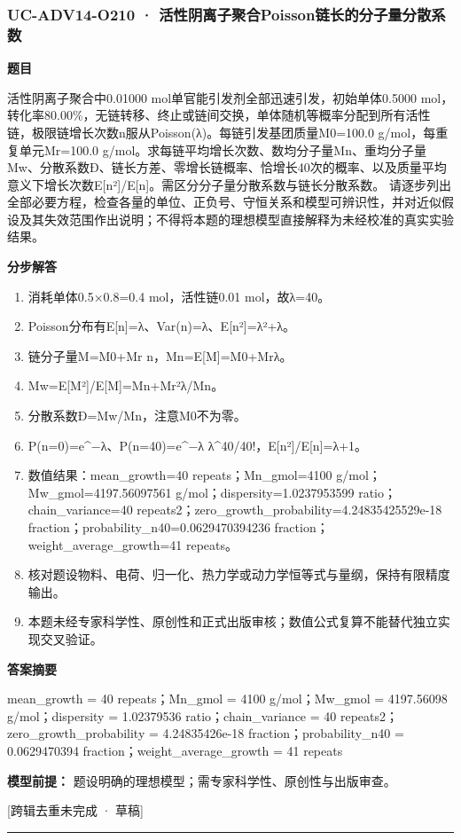 \documentclass[UTF8,11pt,a4paper]{ctexart}
\begin{document}
\subsubsection*{UC-ADV14-O210 · 活性阴离子聚合Poisson链长的分子量分散系数}
\noindent\textbf{题目}\par
活性阴离子聚合中0.01000 mol单官能引发剂全部迅速引发，初始单体0.5000 mol，转化率80.00\%，无链转移、终止或链间交换，单体随机等概率分配到所有活性链，极限链增长次数n服从Poisson(λ)。每链引发基团质量M0=100.0 g/mol，每重复单元Mr=100.0 g/mol。求每链平均增长次数、数均分子量Mn、重均分子量Mw、分散系数Đ、链长方差、零增长链概率、恰增长40次的概率、以及质量平均意义下增长次数E[n²]/E[n]。需区分分子量分散系数与链长分散系数。 请逐步列出全部必要方程，检查各量的单位、正负号、守恒关系和模型可辨识性，并对近似假设及其失效范围作出说明；不得将本题的理想模型直接解释为未经校准的真实实验结果。\par
\medskip\noindent\textbf{分步解答}
\begin{enumerate}
\item 消耗单体0.5×0.8=0.4 mol，活性链0.01 mol，故λ=40。
\item Poisson分布有E[n]=λ、Var(n)=λ、E[n²]=λ²+λ。
\item 链分子量M=M0+Mr n，Mn=E[M]=M0+Mrλ。
\item Mw=E[M²]/E[M]=Mn+Mr²λ/Mn。
\item 分散系数Đ=Mw/Mn，注意M0不为零。
\item P(n=0)=e\textasciicircum{}−λ、P(n=40)=e\textasciicircum{}−λ λ\textasciicircum{}40/40!，E[n²]/E[n]=λ+1。
\item 数值结果：mean\_growth=40 repeats；Mn\_gmol=4100 g/mol；Mw\_gmol=4197.56097561 g/mol；dispersity=1.0237953599 ratio；chain\_variance=40 repeats2；zero\_growth\_probability=4.24835425529e-18 fraction；probability\_n40=0.0629470394236 fraction；weight\_average\_growth=41 repeats。
\item 核对题设物料、电荷、归一化、热力学或动力学恒等式与量纲，保持有限精度输出。
\item 本题未经专家科学性、原创性和正式出版审核；数值公式复算不能替代独立实现交叉验证。
\end{enumerate}
\noindent\textbf{答案摘要}\par
mean\_growth = 40 repeats；Mn\_gmol = 4100 g/mol；Mw\_gmol = 4197.56098 g/mol；dispersity = 1.02379536 ratio；chain\_variance = 40 repeats2；zero\_growth\_probability = 4.24835426e-18 fraction；probability\_n40 = 0.0629470394 fraction；weight\_average\_growth = 41 repeats\par
\noindent\textbf{模型前提：}
题设明确的理想模型；需专家科学性、原创性与出版审查。\par
\noindent\textcolor{red!65!black}{[跨辑去重未完成 · 草稿]} \par
\medskip\hrule\medskip
{}
\end{document}
